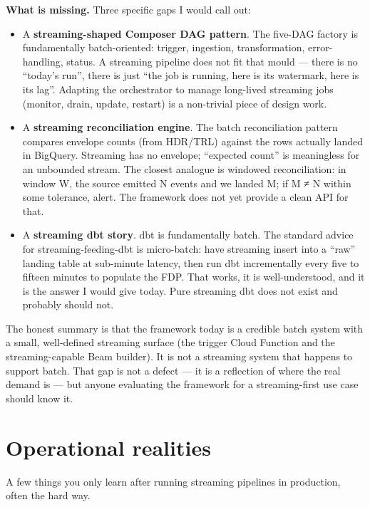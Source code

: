 \documentclass[
  11pt,
  british,
  oneside]{book}
\providecommand{\tightlist}{%
  \setlength{\itemsep}{0pt}\setlength{\parskip}{0pt}}
\begin{document}
\textbf{What is missing.} Three specific gaps I would call out:

\begin{itemize}
\tightlist
\item
  A \textbf{streaming-shaped Composer DAG pattern}. The five-DAG factory
  is fundamentally batch-oriented: trigger, ingestion, transformation,
  error-handling, status. A streaming pipeline does not fit that mould
  --- there is no ``today's run'', there is just ``the job is running,
  here is its watermark, here is its lag''. Adapting the orchestrator to
  manage long-lived streaming jobs (monitor, drain, update, restart) is
  a non-trivial piece of design work.
\item
  A \textbf{streaming reconciliation engine}. The batch reconciliation
  pattern compares envelope counts (from HDR/TRL) against the rows
  actually landed in BigQuery. Streaming has no envelope; ``expected
  count'' is meaningless for an unbounded stream. The closest analogue
  is windowed reconciliation: in window W, the source emitted N events
  and we landed M; if M ≠ N within some tolerance, alert. The framework
  does not yet provide a clean API for that.
\item
  A \textbf{streaming dbt story}. dbt is fundamentally batch.
  The standard advice for streaming-feeding-dbt is
  micro-batch: have streaming insert into a ``raw''
  landing table at sub-minute latency, then run dbt incrementally every
  five to fifteen minutes to populate the FDP. That works, it is
  well-understood, and it is the answer I would give today. Pure
  streaming dbt does not exist and probably should not.
\end{itemize}

The honest summary is that the framework today is a credible batch
system with a small, well-defined streaming surface (the trigger Cloud
Function and the streaming-capable Beam builder). It is not a streaming
system that happens to support batch. That gap is not a defect --- it is
a reflection of where the real demand is --- but anyone evaluating the
framework for a streaming-first use case should know it.

\hypertarget{operational-realities}{%
\section{Operational realities}\label{operational-realities}}

A few things you only learn after running streaming pipelines in
production, often the hard way.
\end{document}
